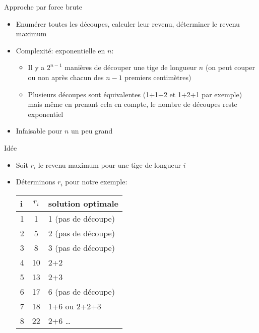 \begin{frame}{Approche par force brute}

\begin{itemize}
\item Enumérer toutes les découpes, calculer leur revenu, déterminer le revenu maximum
\item Complexité: exponentielle en $n$:
\begin{itemize}
\item Il y a $2^{n-1}$ manières de découper une tige de longueur $n$ (on peut couper ou non après chacun des $n-1$ premiers centimètres)
\item Plusieurs découpes sont équivalentes (1+1+2 et 1+2+1 par
  exemple) mais même en prenant cela en compte, le nombre de découpes
  reste exponentiel
\end{itemize}
\item Infaisable pour $n$ un peu grand
\end{itemize}

\end{frame}

\begin{frame}{Idée}
\begin{itemize}
\item Soit $r_i$ le revenu maximum pour une tige de longueur $i$
\item Déterminons $r_i$ pour notre exemple:
\begin{center}
\footnotesize
\begin{tabular}{l|cl}
i & $r_i$ & solution optimale\\
\hline
1 & 1 & 1 (pas de découpe)\\
2 & 5 & 2 (pas de découpe)\\
3 & 8 & 3 (pas de découpe)\\
4 & 10 & 2+2\\
5 & 13 & 2+3\\
6 & 17 & 6 (pas de découpe)\\
7 & 18 & 1+6 ou 2+2+3\\
8 & 22 & 2+6
\ldots\\
\end{tabular}
\end{center}
\end{itemize}

\end{frame}

